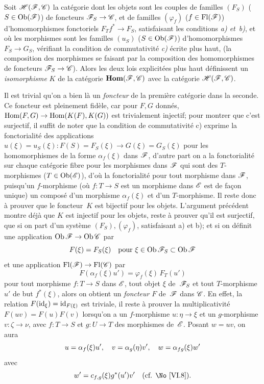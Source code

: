 \begin{proposition}
\label{VI.12.1}
Soit $\cal{H}(\cal{F},\cal{C})$ la cat\'egorie dont les objets sont
les couples de familles $(F_S)$ ($S\in\Ob(\cal{F})$) de foncteurs
$\cal{F}_S\to\cal{C}$, et de familles $(\varphi_f)$
($f\in\Fl(\cal{F})$) d'homomorphismes fonctoriels $F_Tf^*\to F_S$,
satisfaisant les conditions \emph{a) et~b)}, et o\`u les morphismes
sont les familles $(u_S)$ ($S\in\Ob(\cal{F})$) d'homomorphismes
$F_S\to G_S$, v\'erifiant la condition de commutativit\'e
\emph{c)} \'ecrite plus haut, (la composition des morphismes se
faisant par la composition des homomorphismes de foncteurs
$\cal{F}_S\to\cal{C}$). Alors les deux lois explicit\'ees plus haut
d\'efinissent un \emph{isomorphisme} $K$ de la cat\'egorie
$\SheafHom(\cal{F},\cal{C})$ avec la cat\'egorie
$\cal{H}(\cal{F},\cal{C})$.
\end{proposition}

Il est trivial qu'on a bien l\`a un \emph{foncteur} de la
premi\`ere cat\'egorie dans la seconde. Ce foncteur est pleinement
fid\`ele, car pour $F,G$ donn\'es, $\Hom(F,G)\to\Hom(K(F),K(G))$
est trivialement injectif; pour montrer que c'est surjectif, il suffit
de noter que la condition de commutativit\'e c) exprime la
fonctorialit\'e des applications $u(\xi)=u_S(\xi)\colon
F(S)=F_S(\xi)\to G(\xi)=G_S(\xi)$ pour les homomorphismes de la forme
$\alpha_f(\xi)$ dans $\cal{F}$, d'autre part on a la fonctorialit\'e
sur chaque cat\'egorie fibre \ie pour les morphismes dans $\cal{F}$
qui sont des $T$-morphismes ($T\in\Ob(\cal{E})$), d'o\`u la
fonctorialit\'e pour tout morphisme dans $\cal{F}$,
puisqu'un
$f$-morphisme (o\`u $f\colon T\to S$ est un morphisme dans
$\cal{E}$
est de fa\c con unique) un compos\'e d'un morphisme
$\alpha_f(\xi)$ et d'un $T$-morphisme. Il reste donc \`a prouver que
le foncteur~$K$ est bijectif pour les objets. L'argument
pr\'ec\'edent montre d\'ej\`a que $K$ est injectif pour les
objets, reste \`a prouver qu'il est surjectif, \ie que si on part
d'un syst\`eme $(F_S),(\varphi_f)$, satisfaisant a) et b); et si on
d\'efinit une application $\Ob\cal{F}\to\Ob\cal{C}$ par
$$
F(\xi)=F_S(\xi) \quad\text{pour }
\xi\in\Ob\cal{F}_S\subset\Ob\cal{F}
$$
et une application $\Fl(\cal{F})\to\Fl(\cal{C})$ par
$$
F(\alpha_f(\xi)u')=\varphi_f(\xi)\,F_T(u')
$$
pour tout morphisme $f\colon T\to S$ dans $\cal{E}$, tout objet $\xi$
de~$\cal{F}_S$ et tout $T$-morphisme $u'$ de but $f^*(\xi)$, alors on
obtient un \emph{foncteur} $F$ de~$\cal{F}$ dans $\cal{C}$. En effet,
la relation $F(\mathrm{id}_\xi)=\mathrm{id}_{F(\xi)}$ est triviale, il reste \`a
prouver la multiplicativit\'e $F(uv)=F(u)F(v)$ lorsqu'on a un
$f$-morphisme $u\colon\eta\to\xi$ et un $g$-morphisme
$v\colon\zeta\to\nu$, avec $f\colon T\to S$ et $g\colon U\to T$ des
morphismes de~$\cal{E}$. Posant $w=uv$, on aura
$$
u=\alpha_f(\xi)u',\quad v=\alpha_g(\eta)v',\quad w=\alpha_{fg}(\xi)w'
$$
avec
$$
w'=c_{f,g}(\xi)g^*(u')v'\quad \hbox{(\cf \No \ref{VI.8})}.
$$


